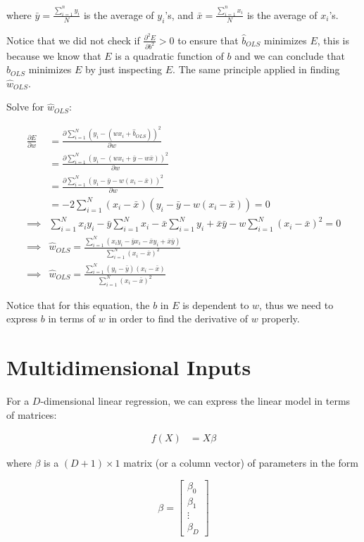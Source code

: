 \documentclass[12pt,a4paper]{article}
\begin{document}
where \(\bar{y}=\frac{\sum^n_{i=1}y_i}{N}\) is the average of \(y_i\)'s,
and \(\bar{x}=\frac{\sum^n_{i=1}x_i}{N}\) is the average of \(x_i\)'s.

Notice that we did not check if \(\frac{\partial^2E}{\partial b^2}>0\)
to ensure that \(\hat b_{OLS}\) minimizes \(E\), this is because we know
that \(E\) is a quadratic function of \(b\) and we can conclude that
\(\hat b_{OLS}\) minimizes \(E\) by just inspecting \(E\). The same
principle applied in finding \(\hat w_{OLS}\).

Solve for \(\hat w_{OLS}\):

\begin{align}\frac{\partial E}{\partial w} &= \frac{\partial\sum^N_{i=1} (y_i-(wx_i+\hat{b}_{OLS}))^2}{\partial w} \\&=\frac{\partial\sum^N_{i=1} (y_i-(wx_i+\bar{y}-w\bar{x}))^2}{\partial w} \\ &=\frac{\partial \sum_{i=1}^N (y_i-\bar{y}-w(x_i-\bar{x}))^2}{\partial w}\\&=-2\sum_{i=1}^N (x_i-\bar{x}) (y_i-\bar y -w(x_i-\bar x))=0\\ \implies &\sum^N_{i=1}x_iy_i-\bar{y} \sum^N_{i=1}x_i-\bar x\sum^N_{i=1}y_i + \bar x \bar y-w\sum^N_{i=1}(x_i-\bar x)^2=0\\\implies &\hat w_{OLS}=\frac{\sum^N_{i=1}(x_iy_i-\bar y x_i - \bar x y_i+\bar x \bar y)}{\sum^N_{i=1}(x_i - \bar x)^2}\\\implies & \hat w_{OLS}=\frac{\sum^N_{i=1}(y_i-\bar y)(x_i-\bar x)}{\sum^N_{i=1}(x_i-\bar x)^2}\end{align}

Notice that for this equation, the \(b\) in \(E\) is dependent to \(w\),
thus we need to express \(b\) in terms of \(w\) in order to find the
derivative of \(w\) properly.


\section{Multidimensional Inputs}

For a \(D\)-dimensional linear regression, we can express the linear
model in terms of matrices:

\begin{align}f(X)&= X\beta\end{align}

where \(\beta\) is a \((D+1) \times 1\) matrix (or a column vector) of
parameters in the form

\begin{equation}\beta=\begin{bmatrix}\beta_0\\\beta_1\\\vdots\\\beta_D\end{bmatrix}\end{equation}
\end{document}
